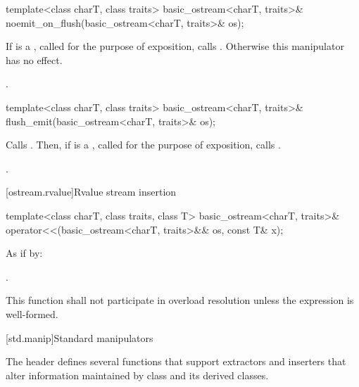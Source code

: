 %
\begin{itemdecl}
template<class charT, class traits>
  basic_ostream<charT, traits>& noemit_on_flush(basic_ostream<charT, traits>& os);
\end{itemdecl}

\begin{itemdescr}
\pnum
\effects
If  is a
,
called  for the purpose of exposition,
calls .
Otherwise this manipulator has no effect.

\pnum
\returns
{}.
\end{itemdescr}

%
\begin{itemdecl}
template<class charT, class traits>
  basic_ostream<charT, traits>& flush_emit(basic_ostream<charT, traits>& os);
\end{itemdecl}

\begin{itemdescr}
\pnum
\effects
Calls .
Then, if  is a
,
called  for the purpose of exposition,
calls .

\pnum
\returns
{}.
\end{itemdescr}

[ostream.rvalue]{Rvalue stream insertion}

%
\begin{itemdecl}
template<class charT, class traits, class T>
  basic_ostream<charT, traits>& operator<<(basic_ostream<charT, traits>&& os, const T& x);
\end{itemdecl}

\begin{itemdescr}
\pnum
\effects As if by: 

\pnum
\returns {}.

\pnum
\remarks This function shall not participate in overload resolution
unless the expression  is well-formed.
\end{itemdescr}


[std.manip]{Standard manipulators}

\pnum The header  defines several functions that support
extractors and inserters that alter information maintained by class
 and its derived classes.

